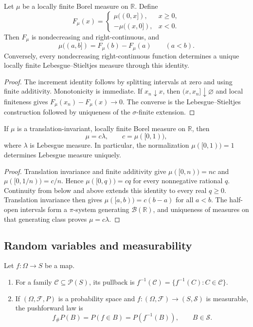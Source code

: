 \begin{prop}
Let $\mu$ be a locally finite Borel measure on $\mathbb R$. Define
\[
F_\mu(x)=
\begin{cases}
 \mu((0,x]),&x\geq0,\\
 -\mu((x,0]),&x<0.
\end{cases}
\]
Then $F_\mu$ is nondecreasing and right-continuous, and
\[
\mu((a,b])=F_\mu(b)-F_\mu(a)
\qquad(a<b).
\]
Conversely, every nondecreasing right-continuous function determines a unique
locally finite Lebesgue--Stieltjes measure through this identity.
\end{prop}

\begin{proof}
The increment identity follows by splitting intervals at zero and using
finite additivity. Monotonicity is immediate. If $x_n\downarrow x$, then
$(x,x_n]\downarrow\varnothing$ and local finiteness gives
$F_\mu(x_n)-F_\mu(x)\to0$. The converse is the Lebesgue--Stieltjes
construction followed by uniqueness of the $\sigma$-finite extension.
\end{proof}

\begin{thm}
If $\mu$ is a translation-invariant, locally finite Borel measure on
$\mathbb R$, then
\[
\mu=c\lambda,
\qquad c=\mu([0,1)),
\]
where $\lambda$ is Lebesgue measure. In particular, the normalization
$\mu([0,1))=1$ determines Lebesgue measure uniquely.
\end{thm}

\begin{proof}
Translation invariance and finite additivity give
$\mu([0,n))=nc$ and $\mu([0,1/n))=c/n$. Hence
$\mu([0,q))=cq$ for every nonnegative rational $q$. Continuity from below and
above extends this identity to every real $q\geq0$. Translation invariance
then gives $\mu([a,b))=c(b-a)$ for all $a<b$. The half-open intervals form a
$\pi$-system generating $\mathcal B(\mathbb R)$, and uniqueness of measures
on that generating class proves $\mu=c\lambda$.
\end{proof}

\subsection{Random variables and measurability}

\begin{de}
Let $f:\Omega\to S$ be a map.
\begin{enumerate}[label=(\roman*)]
  \item For a family $\mathcal C\subseteq\mathcal P(S)$, its pullback is
  $f^{-1}(\mathcal C)=\{f^{-1}(C):C\in\mathcal C\}$.
  \item If $(\Omega,\mathcal F,P)$ is a probability space and
  $f:(\Omega,\mathcal F)\to(S,\mathcal S)$ is measurable, the pushforward
  law is
  \[
  f_\#P(B)=P(f\in B)=P(f^{-1}(B)),\qquad B\in\mathcal S.
  \]
\end{enumerate}
\end{de}

